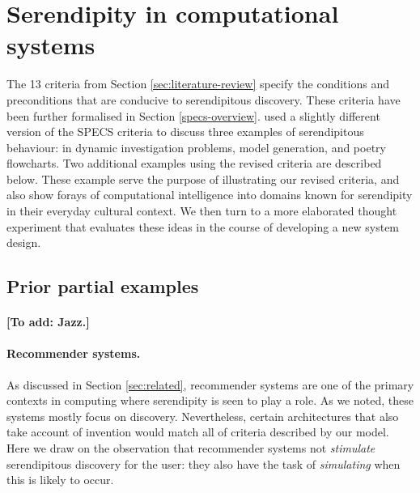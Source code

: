 \section{Serendipity in computational systems} \label{sec:computational-serendipity}

The 13 criteria from Section \ref{sec:literature-review} specify the
conditions and preconditions that are conducive to serendipitous
discovery.  These criteria have been further formalised
in Section \ref{specs-overview}.
% 
 used a slightly different version of the
SPECS criteria to discuss three examples of serendipitous behaviour:
in dynamic investigation problems, model generation, and poetry
flowcharts.  Two additional examples using the revised criteria are
described below.  These example serve the purpose of illustrating our
revised criteria, and also show forays of computational intelligence
into domains known for serendipity in their everyday cultural context.
We then turn to a more elaborated thought experiment that evaluates
these ideas in the course of developing a new system design.

% 

\subsection{Prior partial examples}

\paragraph{{[}To add: Jazz.{]}}


\paragraph{Recommender systems.} 

As discussed in Section \ref{sec:related}, recommender systems are one
of the primary contexts in computing where serendipity is seen to play
a role.  As we noted, these systems mostly focus on discovery.
Nevertheless, certain architectures that also take account of
invention would match all of criteria described by our model.  Here we
draw on the observation that recommender systems not \emph{stimulate}
serendipitous discovery for the user: they also have the task of
\emph{simulating} when this is likely to occur.

